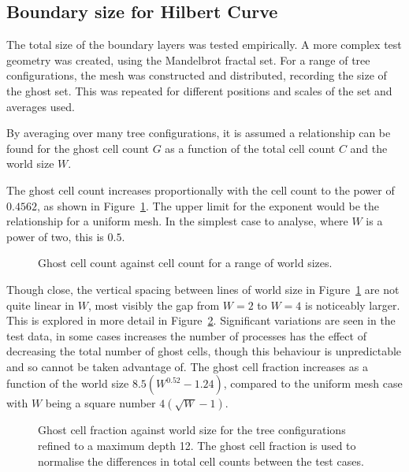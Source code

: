 \documentclass[twoside]{IIBproject}
\numberwithin{figure}{section}
\begin{document}
    \subsection{Boundary size for Hilbert Curve}
        \label{sec:results-boundarysize}

        The total size of the boundary layers was tested empirically. A more complex test geometry was created, using the Mandelbrot fractal set. For a range of tree configurations, the mesh was constructed and distributed, recording the size of the ghost set. This was repeated for different positions and scales of the set and averages used.

        By averaging over many tree configurations, it is assumed a relationship can be found for the ghost cell count $G$ as a function of the total cell count $C$ and the world size $W$.

        The ghost cell count increases proportionally with the cell count to the power of $0.4562$, as shown in Figure~\ref{fig:anal-scaling}. The upper limit for the exponent would be the relationship for a uniform mesh. In the simplest case to analyse, where $W$ is a power of two, this is $0.5$. 

        \tikzset{external/export next=false}
        \begin{figure}[H]
            \centering
            
            \caption{Ghost cell count against cell count for a range of world sizes. }
            \label{fig:anal-scaling}
        \end{figure}

        Though close, the vertical spacing between lines of world size in Figure~\ref{fig:anal-scaling} are not quite linear in $W$, most visibly the gap from $W=2$ to $W=4$ is noticeably larger. This is explored in more detail in Figure~\ref{fig:anal-borderworldsize}. Significant variations are seen in the test data, in some cases increases the number of processes has the effect of decreasing the total number of ghost cells, though this behaviour is unpredictable and so cannot be taken advantage of. The ghost cell fraction increases as a function of the world size $8.5(W^{0.52}-1.24)$, compared to the uniform mesh case with $W$ being a square number $4(\sqrt{W} - 1)$. 

        \tikzset{external/export next=false}
        \begin{figure}[H]
            \centering
            
            \caption{Ghost cell fraction against world size for the tree configurations refined to a maximum depth 12. The ghost cell fraction is used to normalise the differences in total cell counts between the test cases.}
            \label{fig:anal-borderworldsize}
        \end{figure}
\end{document}
